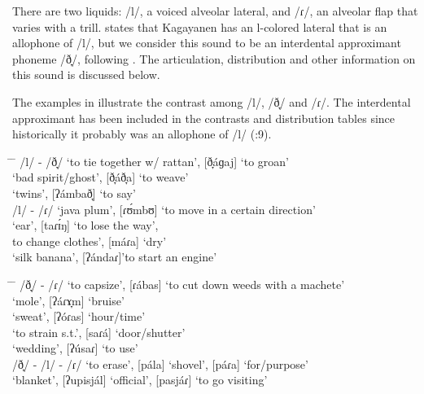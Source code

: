 There are two liquids: /l/, a voiced alveolar lateral, and /ɾ/, an alveolar flap that varies with a trill. \citet[16--17]{harmon1977} states that Kagayanen has an l-colored lateral that is an allophone of /l/, but we consider this sound to be an interdental approximant phoneme /ð̞/, following \citet{olson2010}. The articulation, distribution and other information on this sound is discussed below.

The examples in  illustrate the contrast among /l/, /ð̞/ and /ɾ/. The interdental approximant has been included in the contrasts and distribution tables since historically it probably was an allophone of /l/ (\citealt{olson2008}:9).
\ea
\label{groan}
\begin{tabbing}
\hspace{1.3cm} \= \hspace{.3cm} \= \kill
/l/ - /ð̞/ \> [láɡɡaj] ‘to tie together w/ rattan’, [ð̞áɡaj] ‘to groan’ \\
\>   [lálaʔ] ‘bad spirit/ghost’, [ð̞áð̞a] ‘to weave’ \\
\>   [kámbal] ‘twins’, [ʔámbað̞] ‘to say’ \\
/l/ - /ɾ/ \> [lʊ́mbʊj] ‘java plum’, [ɾʊ́mbʊ] ‘to move in a certain direction’ \\
\>   [talíŋa] ‘ear’, [taɾɪ́ŋ] ‘to lose the way’, \\
\>   [málaʔ] to change clothes’, [máɾa] ‘dry’ \\
\>   [kʊ́ndal] ‘silk banana’, [ʔándaɾ]’to start an engine’ \\
\end{tabbing}
\newpage
\begin{tabbing}
\hspace{1.3cm} \= \hspace{.3cm} \= \kill
/ð̞/ - /ɾ/ \> [ð̞ábʊ] ‘to capsize’, [ɾábas] ‘to cut down weeds with a machete’ \\
\>   [ʔáð̞ɤ̞ŋ] ‘mole’, [ʔáɾɤ̞m] ‘bruise’ \\
\>   [ʔuð̞ás] ‘sweat’, [ʔóɾas] ‘hour/time’ \\
\>   [sáð̞aʔ] ‘to strain  s.t.’, [saɾá] ‘door/shutter’ \\
\>   [kasáð̞] ‘wedding’, [ʔúsaɾ] ‘to use’ \\
/ð̞/ - /l/ - /ɾ/ \> \> [páð̞a] ‘to erase’, [pála] ‘shovel’, [páɾa] ‘for/purpose’ \\
\>   [ʔisjáð̞] ‘blanket’, [ʔupisjál] ‘official’, [pasjáɾ] ‘to go visiting’
\end{tabbing}
\z

